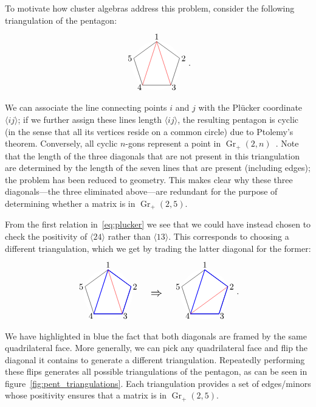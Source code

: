\documentclass[12pt]{article}
\DeclareMathOperator{\Gr}{Gr}
\def\ket#1{\langle #1 \rangle}
\def\drawLabeledPentagon{
\coordinate (P1) at (90:1);
\coordinate (P2) at (18:1);
\coordinate (P3) at (306:1);
\coordinate (P4) at (234:1);
\coordinate (P5) at (162:1);
\draw[white,fill=white] (0,0) circle (1cm);
\draw (P1) -- (P2) -- (P3) -- (P4) -- (P5) -- cycle;
\draw (0,1.2) node {1};
\draw (.9,.3) node[anchor=west] {2};
\draw (.5,-.9) node[anchor=west] {3};
\draw (-.5,-.9) node[anchor=east] {4};
\draw (-.9,.3) node[anchor=east] {5};
}
\begin{document}
To motivate how cluster algebras address this problem, consider the following triangulation of the pentagon:
\begin{equation} \label{eq:pent_triangulation}
\begin{gathered}
\begin{tikzpicture}
  \drawLabeledPentagon
  \draw[color=red] (P1) -- (P3);
  \draw[color=red] (P1) -- (P4);
\end{tikzpicture} 
\end{gathered} .
\end{equation}
We can associate the line connecting points $i$ and $j$ with the Pl\"ucker coordinate $\ket{ij}$; if we further assign these lines length $\ket{ij}$, the resulting pentagon is cyclic (in the sense that all its vertices reside on a common circle) due to Ptolemy's theorem. Conversely, all cyclic $n$-gons represent a point in $\Gr_+(2,n)$~\cite{Arkani-Hamed:2014bca}. Note that the length of the three diagonals that are not present in this triangulation are determined by the length of the seven lines that are present (including edges); the problem has been reduced to geometry. This makes clear why these three diagonals---the three eliminated above---are redundant for the purpose of determining whether a matrix is in $\Gr_+(2,5)$. 

From the first relation in~\eqref{eq:plucker} we see that we could have instead chosen to check the positivity of $\ket{24}$ rather than $\ket{13}$. This corresponds to choosing a different triangulation, which we get by trading the latter diagonal for the former:
\begin{equation}
\begin{gathered}
\begin{tikzpicture}
  \drawLabeledPentagon
  \draw[color=blue, thick] (P1) -- (P2) -- (P3) -- (P4) -- cycle;
  \draw[color=red] (P1) -- (P3);
  \draw (2,0) node {\scalebox{1.4}{$\Rightarrow$}};
\begin{scope}[xshift = 4cm]
  \drawLabeledPentagon
  \draw[color=blue, thick] (P1) -- (P2) -- (P3) -- (P4) -- cycle;
  \draw[color=red] (P2) -- (P4); 
\end{scope}
\end{tikzpicture}
\end{gathered}.  
\end{equation}
We have highlighted in blue the fact that both diagonals are framed by the same quadrilateral face. More generally, we can pick any quadrilateral face and flip the diagonal it contains to generate a different triangulation. Repeatedly performing these flips generates all possible triangulations of the pentagon, as can be seen in figure~\ref{fig:pent_triangulations}. Each triangulation provides a set of edges/minors whose positivity ensures that a matrix is in $\Gr_+(2,5)$. 
\end{document}
